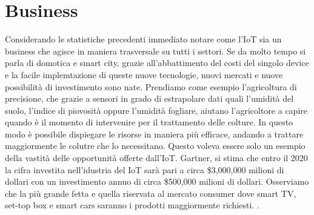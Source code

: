 \section{Business}
Considerando le statistiche precedenti immediato notare come l'IoT sia un
business che agisce in maniera trasversale su tutti i settori.  Se da molto
tempo si parla di domotica e smart city, grazie all'abbattimento del costi del
singolo  device e la facile implemtazione di queste nuove tecnologie,  nuovi
mercati e nuove possibilità di investimento sono nate. Prendiamo come esempio
l'agricoltura di precisione, che grazie a sensori in grado di estrapolare dati
quali l'umidità del suolo, l'indice di piovosità oppure l'umidità  fogliare,
aiutano l'agricoltore a  capire quando è il momento di intervenire per il
trattamento delle colture. In questo modo è possibile dispiegare le risorse in
maniera più efficace, andando a trattare maggiormente le colutre che lo
necessitano.
Questo voleva essere solo un esempio della vastità delle opportunità  offerte dall'IoT.
Gartner, si stima che entro il 2020 la cifra investita nell'idustria del IoT
sarà pari a circa \$3,000,000 milioni di dollari con un investimento annuo di
circa \$500,000 milioni di dollari. Osserviamo che la più grande fetta e quella
riservata al mercato consumer dove smart TV, set-top box e smart cars saranno i prodotti
maggiormente richiesti.
\cite{gartner2016}. 



